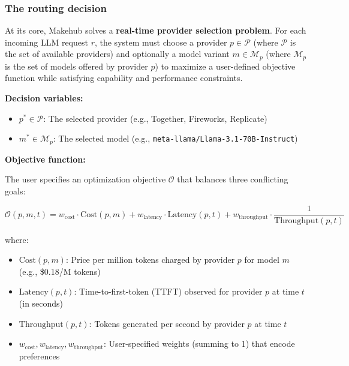 \documentclass[english]{article}
\begin{document}
\subsubsection{The routing decision}

At its core, Makehub solves a \textbf{real-time provider selection problem}. For each incoming LLM request $r$, the system must choose a provider $p \in \mathcal{P}$ (where $\mathcal{P}$ is the set of available providers) and optionally a model variant $m \in \mathcal{M}_p$ (where $\mathcal{M}_p$ is the set of models offered by provider $p$) to maximize a user-defined objective function while satisfying capability and performance constraints.

\medskip

\noindent\textbf{Decision variables:}
\begin{itemize}
    \item $p^* \in \mathcal{P}$: The selected provider (e.g., Together, Fireworks, Replicate)
    \item $m^* \in \mathcal{M}_p$: The selected model (e.g., \texttt{meta-llama/Llama-3.1-70B-Instruct})
\end{itemize}

\medskip

\noindent\textbf{Objective function:}

The user specifies an optimization objective $\mathcal{O}$ that balances three conflicting goals:

\begin{equation}
\mathcal{O}(p, m, t) = w_{\text{cost}} \cdot \text{Cost}(p, m) + w_{\text{latency}} \cdot \text{Latency}(p, t) + w_{\text{throughput}} \cdot \frac{1}{\text{Throughput}(p, t)}
\end{equation}

where:
\begin{itemize}
    \item $\text{Cost}(p, m)$: Price per million tokens charged by provider $p$ for model $m$ (e.g., \$0.18/M tokens)
    \item $\text{Latency}(p, t)$: Time-to-first-token (TTFT) observed for provider $p$ at time $t$ (in seconds)
    \item $\text{Throughput}(p, t)$: Tokens generated per second by provider $p$ at time $t$
    \item $w_{\text{cost}}, w_{\text{latency}}, w_{\text{throughput}}$: User-specified weights (summing to 1) that encode preferences
\end{itemize}
\end{document}
